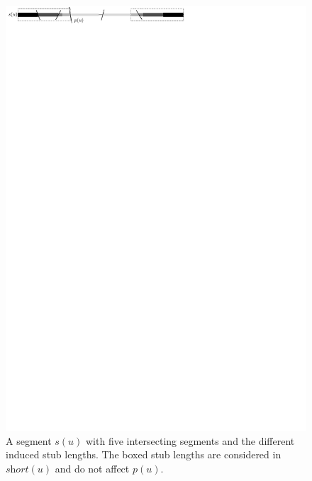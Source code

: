 \documentclass[a4paper,english,numberwithinsect]{eurocg18}
\newcommand{\martin}[1]{\todo[inline,color=blue!40]{MN: #1}}
\newcommand{\fabian}[1]{\todo[inline,color=pink!40]{FK: #1}}
\newcommand{\solshort}{\ensuremath{\textit{short}}\xspace}
\begin{document}
\begin{figure}[tbp]
	\centering
 	\includegraphics{tree_illustration}
	\caption{A segment $s(u)$ with five intersecting segments and the different induced stub lengths. The boxed stub lengths are considered in $\solshort(u)$ and do not affect $p(u)$.} %
	\label{fig:tree}
\end{figure}

%
\end{document}
